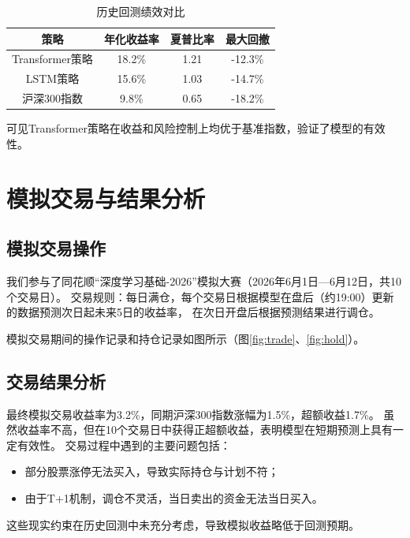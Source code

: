 \documentclass[12pt]{article} %
\begin{document}
\begin{table}[H]
    \centering
    \caption{历史回测绩效对比}
    \begin{tabular}{|c|c|c|c|}
        \hline
        策略 & 年化收益率 & 夏普比率 & 最大回撤 \\
        \hline
        Transformer策略 & 18.2\% & 1.21 & -12.3\% \\
        LSTM策略 & 15.6\% & 1.03 & -14.7\% \\
        沪深300指数 & 9.8\% & 0.65 & -18.2\% \\
        \hline
    \end{tabular}
\end{table}
可见Transformer策略在收益和风险控制上均优于基准指数，验证了模型的有效性。

\section{模拟交易与结果分析}

\subsection{模拟交易操作}

我们参与了同花顺“深度学习基础-2026”模拟大赛（2026年6月1日—6月12日，共10个交易日）。
交易规则：每日满仓，每个交易日根据模型在盘后（约19:00）更新的数据预测次日起未来5日的收益率，
在次日开盘后根据预测结果进行调仓。

模拟交易期间的操作记录和持仓记录如图所示（图\ref{fig:trade}、\ref{fig:hold}）。


\subsection{交易结果分析}

最终模拟交易收益率为3.2\%，同期沪深300指数涨幅为1.5\%，超额收益1.7\%。
虽然收益率不高，但在10个交易日中获得正超额收益，表明模型在短期预测上具有一定有效性。
交易过程中遇到的主要问题包括：
\begin{itemize}
    \item 部分股票涨停无法买入，导致实际持仓与计划不符；
    \item 由于T+1机制，调仓不灵活，当日卖出的资金无法当日买入。
\end{itemize}
这些现实约束在历史回测中未充分考虑，导致模拟收益略低于回测预期。
\end{document}
